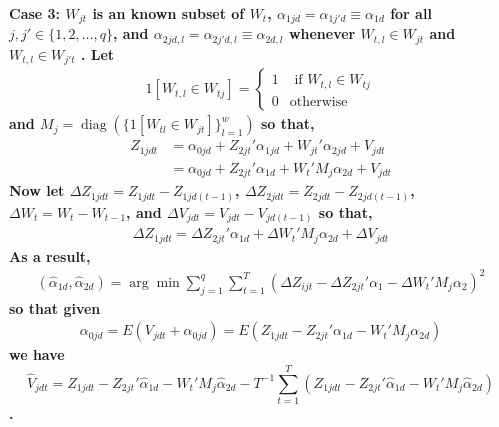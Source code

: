 \documentclass[10pt]{article}
\DeclareMathOperator{\diag}{diag}
\begin{document}
\noindent \bf Case 3: \rm $W_{jt}$ is an known subset of $W_{t}$, $\alpha_{1jd} =\alpha_{1j'd} \equiv \alpha_{1d}$ for all $j,j' \in \{1,2, \ldots,q\}$, and $\alpha_{2jd,l} = \alpha_{2j'd,l} \equiv \alpha_{2d,l}$ whenever $W_{t,l} \in W_{jt}$ and $W_{t,l} \in W_{j't}$ . Let
\begin{align*}
1[W_{t,l} \in W_{tj}] =
\begin{cases}
1 & \text{ if } W_{t,l} \in W_{tj} \\
0 & \text{otherwise}
\end{cases}
%
\end{align*}
%
and $M_j = \diag(\{1[ W_{tl} \in W_{jt}] \}_{l=1}^w)$ so that,
%
\begin{align*}
Z_{1jdt} &= \alpha_{0jd} + Z_{2jt}' \alpha_{1jd} + W_{jt}' \alpha_{2jd} + V_{jdt} \\
& =\alpha_{0jd} + Z_{2jt}' \alpha_{1d} + W_{t}'M_j \alpha_{2d} + V_{jdt}
\end{align*}
Now let $\Delta Z_{1jdt} = Z_{1jdt} - Z_{1jd(t-1)}$, $\Delta Z_{2jdt} = Z_{2jdt} - Z_{2jd(t-1)}$, $\Delta W_{t} = W_{t} - W_{t-1}$, and $\Delta V_{jdt} = V_{jdt} - V_{jd(t-1)}$ so that,
\begin{align*}
\Delta Z_{1jdt} =\Delta Z_{2jt}' \alpha_{1d} + \Delta W_{t}'M_j \alpha_{2d} + \Delta V_{jdt}
\end{align*}
%
As a result,
%
\begin{align*}
(\hat{\alpha}_{1d},\hat{\alpha}_{2d})  = \arg \min \sum_{j=1}^q\sum_{t=1}^T\left( \Delta Z_{ijt} -  \Delta Z_{2jt}'\alpha_{1} - \Delta W_{t}'M_j\alpha_{2} \right)^2
\end{align*}
%
\noindent so that given
\begin{align*}
\alpha_{0jd} =  E(V_{jdt} + \alpha_{0jd}) =
E( Z_{1jdt} - Z_{2jt}'\alpha_{1d} - W_{t}'M_j\alpha_{2d})
\end{align*}
we have
 $$\hat{V}_{jdt} = Z_{1jdt} - Z_{2jt}'\hat{\alpha}_{1d} - W_{t}'M_j\hat{\alpha}_{2d} - T^{-1}\sum_{t=1}^T  (Z_{1jdt} - Z_{2jt}'\hat{\alpha}_{1d} - W_{t}'M_j\hat{\alpha}_{2d}) $$.
\end{document}
